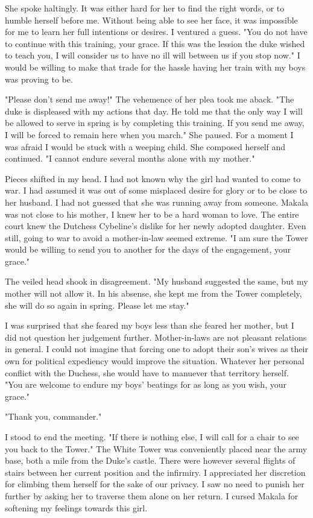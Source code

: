 \documentclass{article}
\begin{document}
She spoke haltingly. It was either hard for her to find the right words, or to humble herself before me. Without being able to see her face, it was impossible for me to learn her full intentions or desires. I ventured a guess. "You do not have to continue with this training, your grace. If this was the lession the duke wished to teach you, I will consider us to have no ill will between us if you stop now." I would be willing to make that trade for the hassle having her train with my boys was proving to be.

"Please don't send me away!" The vehemence of her plea took me aback. "The duke is displeased with my actions that day. He told me that the only way I will be allowed to serve in spring is by completing this training. If you send me away, I will be forced to remain here when you march." She paused. For a moment I was afraid I would be stuck with a weeping child. She composed herself and continued. "I cannot endure several months alone with my mother."

Pieces shifted in my head. I had not known why the girl had wanted to come to war. I had assumed it was out of some misplaced desire for glory or to be close to her husband. I had not guessed that she was running away from someone. Makala was not close to his mother, I knew her to be a hard woman to love. The entire court knew the Dutchess Cybeline's dislike for her newly adopted daughter. Even still, going to war to avoid a mother-in-law seemed extreme.  "I am sure the Tower would be willing to send you to another for the days of the engagement, your grace."

The veiled head shook in disagreement. "My husband suggested the same, but my mother will not allow it. In his absense, she kept me from the Tower completely, she will do so again in spring. Please let me stay."

I was surprised that she feared my boys less than she feared her mother, but I did not question her judgement further. Mother-in-laws are not pleasant relations in general. I could not imagine that forcing one to adopt their son's wives as their own for political expediency would improve the situation. Whatever her personal conflict with the Duchess, she would have to manuever that territory herself. "You are welcome to endure my boys' beatings for as long as you wish, your grace."

"Thank you, commander."

I stood to end the meeting. "If there is nothing else, I will call for a chair to see you back to the Tower." The White Tower was conveniently placed near the army base, both a mile from the Duke's castle. There were however several flights of stairs between her current position and the infirmiry. I appreciated her discretion for climbing them herself for the sake of our privacy. I saw no need to punish her further by asking her to traverse them alone on her return. I cursed Makala for softening my feelings towards this girl.
\end{document}
